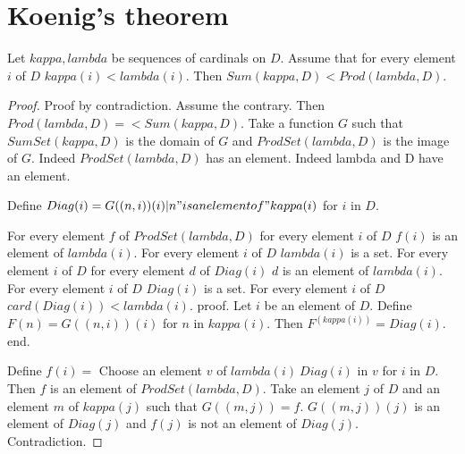 \documentclass{article}
\begin{document}
  \section*{Koenig's theorem}

  \begin{forthel}
    \begin{theorem}[Koenig]
      Let $kappa, lambda$ be sequences of cardinals on $D$. Assume that for every element $i$ of $D$ $kappa(i) < lambda(i)$. Then $Sum(kappa,D) < Prod(lambda,D)$.
    \end{theorem}
    \begin{proof}
      Proof by contradiction. Assume the contrary. Then $Prod(lambda,D) =< Sum(kappa,D)$.
      Take a function $G$ such that $SumSet(kappa,D)$ is the domain of $G$ and $ProdSet(lambda,D)$ is the image of $G$.
      Indeed $ProdSet(lambda, D)$ has an element. Indeed lambda and D have an element.
      
      Define $Diag(i) = {G((n,i))(i) | n "is an element of" kappa(i)}$ for $i$ in $D$.

      For every element $f$ of $ProdSet(lambda, D)$ for every element $i$ of $D$ $f(i)$ is an element of $lambda(i)$.
      For every element $i$ of $D$ $lambda(i)$ is a set.
      For every element $i$ of $D$ for every element $d$ of $Diag(i)$ $d$ is an element of $lambda(i)$.
      For every element $i$ of $D$ $Diag(i)$ is a set.
      For every element $i$ of $D$ $card(Diag(i)) < lambda(i)$.
      proof.
        Let $i$ be an element of $D$. Define $F(n) = G((n,i))(i)$ for $n$ in $kappa(i)$. Then $F^(kappa(i)) = Diag(i)$.
      end.

      Define $f(i) =$ Choose an element $v$ of $lambda(i) \ Diag(i)$ in $v$ for $i$ in $D$. Then $f$ is an element of $ProdSet(lambda,D)$. Take an element $j$ of $D$ and an element $m$ of $kappa(j)$ such that $G((m,j)) = f$. $G((m,j))(j)$ is an element of $Diag(j)$ and $f(j)$ is not an element of $Diag(j)$. Contradiction.
    \end{proof}
  \end{forthel}
\end{document}
